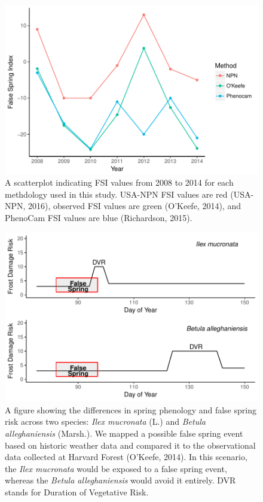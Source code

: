 \documentclass{article}\usepackage[]{graphicx}\usepackage[]{color}
\makeatletter
\def\maxwidth{ %
  \ifdim\Gin@nat@width>\linewidth
    \linewidth
  \else
    \Gin@nat@width
  \fi
}
\makeatother
\begin{document}
\begin{figure}[H]

{\centering \includegraphics[width=\maxwidth]{figure/fsifig-1} 

}

\caption[A scatterplot indicating FSI values from 2008 to 2014 for each methdology used in this study]{A scatterplot indicating FSI values from 2008 to 2014 for each methdology used in this study. USA-NPN FSI values are red (USA-NPN, 2016), observed FSI values are green (O'Keefe, 2014), and PhenoCam FSI values are blue (Richardson, 2015).}\label{fig:fsifig}
\end{figure}



\begin{figure}[H]

{\centering \includegraphics[width=\maxwidth]{figure/risk-1} 

}

\caption{A figure showing the differences in spring phenology and false spring risk across two species: \textit{Ilex mucronata} (L.) and \textit{Betula alleghaniensis} (Marsh.). We mapped a possible false spring event based on historic weather data and compared it to the observational data collected at Harvard Forest (O'Keefe, 2014). In this scenario, the \textit{Ilex mucronata} would be exposed to a false spring event, whereas the \textit{Betula alleghaniensis} would avoid it entirely. DVR stands for Duration of Vegetative Risk.}\label{fig:risk}
\end{figure}
\end{document}
